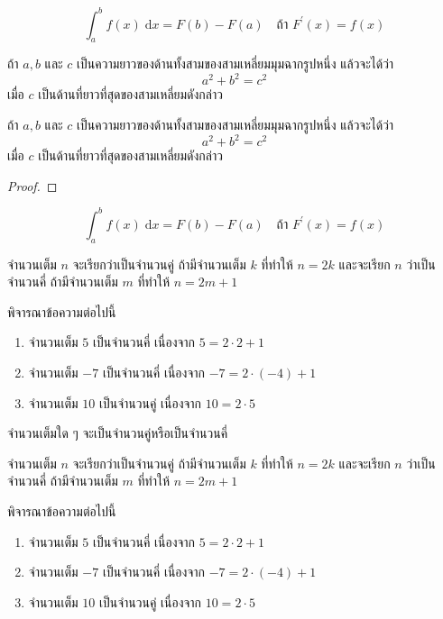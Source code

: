 \begin{content}
\begin{equation}
	\int_{a}^{b} f(x) \;\mathrm{d}x = F(b) - F(a) \quad\text{ถ้า }F^\prime(x) = f(x)
\end{equation}
\begin{theorem}[พีธาโกรัส]
ถ้า $a,b$ และ $c$ เป็นความยาวของด้านทั้งสามของสามเหลี่ยมมุมฉากรูปหนึ่ง แล้วจะได้ว่า $$a^2+b^2 = c^2$$ เมื่อ $c$ เป็นด้านที่ยาวที่สุดของสามเหลี่ยมดังกล่าว
\end{theorem}
\begin{theorem}
ถ้า $a,b$ และ $c$ เป็นความยาวของด้านทั้งสามของสามเหลี่ยมมุมฉากรูปหนึ่ง แล้วจะได้ว่า $$a^2+b^2 = c^2$$ เมื่อ $c$ เป็นด้านที่ยาวที่สุดของสามเหลี่ยมดังกล่าว
\end{theorem}
\begin{proof}
\end{proof}
\begin{equation}
	\int_{a}^{b} f(x) \;\mathrm{d}x = F(b) - F(a) \quad\text{ถ้า }F^\prime(x) = f(x)
\end{equation}
\begin{definition}
จำนวนเต็ม $n$ จะเรียกว่าเป็นจำนวนคู่ ถ้ามีจำนวนเต็ม $k$ ที่ทำให้ $n = 2k$	 และจะเรียก $n$ ว่าเป็นจำนวนคี่ ถ้ามีจำนวนเต็ม $m$ ที่ทำให้ $n = 2m + 1$
\end{definition}
\begin{example}
พิจารณาข้อความต่อไปนี้
\begin{enumerate}
	\item จำนวนเต็ม $5$ เป็นจำนวนคี่ เนื่องจาก $5 = 2\cdot 2 + 1$
	\item จำนวนเต็ม $-7$ เป็นจำนวนคี่ เนื่องจาก $-7 = 2\cdot (-4) + 1$
	\item จำนวนเต็ม $10$ เป็นจำนวนคู่ เนื่องจาก $10 = 2\cdot 5$
\end{enumerate}
\end{example}
\begin{theorem}
จำนวนเต็มใด ๆ จะเป็นจำนวนคู่หรือเป็นจำนวนคี่
\end{theorem}
\begin{definition}[จำนวนคู่/คี่]
จำนวนเต็ม $n$ จะเรียกว่าเป็นจำนวนคู่ ถ้ามีจำนวนเต็ม $k$ ที่ทำให้ $n = 2k$	 และจะเรียก $n$ ว่าเป็นจำนวนคี่ ถ้ามีจำนวนเต็ม $m$ ที่ทำให้ $n = 2m + 1$
\end{definition}
\begin{example}
พิจารณาข้อความต่อไปนี้
\begin{enumerate}
	\item จำนวนเต็ม $5$ เป็นจำนวนคี่ เนื่องจาก $5 = 2\cdot 2 + 1$
	\item จำนวนเต็ม $-7$ เป็นจำนวนคี่ เนื่องจาก $-7 = 2\cdot (-4) + 1$
	\item จำนวนเต็ม $10$ เป็นจำนวนคู่ เนื่องจาก $10 = 2\cdot 5$
\end{enumerate}
\end{example}


\end{content}
